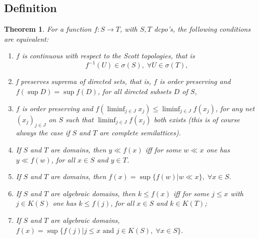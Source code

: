 \documentclass[a4paper,12pt]{article}
\newtheorem{theorem}{Theorem}[section]
\begin{document}
\subsection{Definition}
\begin{theorem} For a function $f: S \rightarrow T$, with $S,T$ dcpo's, the following conditions are equivalent:
\begin{enumerate}
    \item $f$ is continuous with respect to the Scott topologies, that is $$f^{-1}(U) \in \sigma(S),\; \forall U \in \sigma(T),$$
    \item f preserves suprema of directed sets, that is, $f$ is order preserving and $f(\sup D) = \sup f(D)$, for all directed subsets $D$ of $S$,
    \item $f$ is order preserving and $f(\liminf_{j\in J} x_j) \leq \liminf_{j \in J} f(x_j)$, for any net $(x_j)_{j \in J}$ on $S$ such that $\liminf_{j\in J} f(x_j)$ both exists (this is of course always the case if $S$ and $T$ are complete semilattices).
    \item If $S$ and $T$ are domains, then $y \ll f(x)$ iff for some $w \ll x$ one has $y \ll f(w)$, for all $x \in S$ and $y \in T$.
    \item If $S$ and $T$ are domains, then $f(x) = \sup\{f(w)| w \ll x\},\;\forall x \in S.$
    \item If $S$ and $T$ are algebraic domains, then $k \leq f(x)$ iff for some $j \leq x$ with $j \in K(S)$ one has $k \leq f(j)$, for all $x \in S$ and $k \in K(T)$;
    \item If $S$ and $T$ are algebraic domains, $f(x) = \sup\{f(j) | j \leq x \text { and } j \in K(S),\; \forall x \in S\}$.
\end{enumerate}
\end{theorem}
\end{document}
